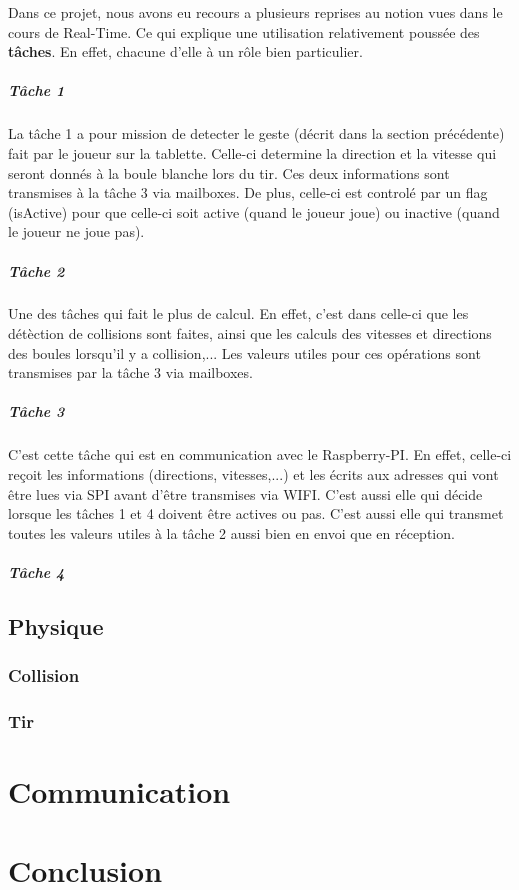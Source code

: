 Dans ce projet, nous avons eu recours a plusieurs reprises au notion vues dans le cours de Real-Time. Ce qui explique une utilisation relativement poussée des \textbf{tâches}. En effet, chacune d'elle à un rôle bien particulier.

\paragraph{Tâche 1}

La tâche 1 a pour mission de detecter le geste (décrit dans la section précédente) fait par le joueur sur la tablette. Celle-ci determine la direction et la vitesse qui seront donnés à la boule blanche lors du tir. Ces deux informations sont transmises à la tâche 3 via mailboxes. De plus, celle-ci est controlé par un flag (isActive) pour que celle-ci soit active (quand le joueur joue) ou inactive (quand le joueur ne joue pas).

\paragraph{Tâche 2}

Une des tâches qui fait le plus de calcul. En effet, c'est dans celle-ci que les détèction de collisions sont faites, ainsi que les calculs des vitesses et directions des boules lorsqu'il y a collision,... Les valeurs utiles pour ces opérations sont transmises par la tâche 3 via mailboxes. 

\paragraph{Tâche 3}

C'est cette tâche qui est en communication avec le Raspberry-PI. En effet, celle-ci reçoit les informations (directions, vitesses,...) et les écrits aux adresses qui vont être lues via SPI avant d'être transmises via WIFI. C'est aussi elle qui décide lorsque les tâches 1 et 4 doivent être actives ou pas. C'est aussi elle qui transmet toutes les valeurs  utiles à la tâche 2 aussi bien en envoi que en réception. 

\paragraph{Tâche 4}














\section{Physique}
	\subsection{Collision}
	\subsection{Tir}

\chapter{Communication}
\chapter{Conclusion}
